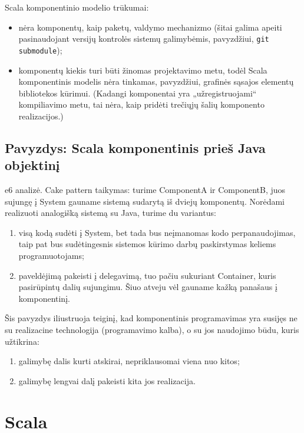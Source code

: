 Scala komponentinio modelio trūkumai:
\begin{itemize}
  \item nėra komponentų, kaip paketų, valdymo mechanizmo (šitai galima
    apeiti pasinaudojant versijų kontrolės sistemų galimybėmis,
    pavyzdžiui, \verb|git submodule|);
  \item komponentų kiekis turi būti žinomas projektavimo metu, todėl
    Scala komponentinis modelis nėra tinkamas, pavyzdžiui,
    grafinės sąsajos elementų bibliotekos 
    kūrimui. (Kadangi komponentai yra „užregistruojami“
    kompiliavimo metu, tai nėra, kaip pridėti trečiųjų šalių
    komponento realizacijos.)
\end{itemize}

\section{Pavyzdys: Scala komponentinis prieš Java objektinį}

e6 analizė. Cake pattern taikymas: turime ComponentA ir ComponentB,
juos sujungę į System gauname sistemą sudarytą iš dviejų komponentų.
Norėdami realizuoti analogišką sistemą su Java, turime du variantus:
\begin{enumerate}
  \item visą kodą sudėti į System, bet tada bus neįmanomas kodo
    perpanaudojimas, taip pat bus sudėtingesnis sistemos kūrimo
    darbų paskirstymas keliems programuotojams;
  \item \label{scala:exmp:enum:2} paveldėjimą pakeisti į delegavimą,
    tuo pačiu sukuriant Container, kuris pasirūpintų dalių
    sujungimu. Šiuo atveju vėl gauname kažką panašaus į
    komponentinį.
\end{enumerate}

Šis pavyzdys iliustruoja teiginį, kad komponentinis programavimas yra
susijęs ne su realizacine technologija (programavimo kalba), o su
jos naudojimo būdu, kuris užtikrina:
\begin{enumerate}
  \item galimybę dalis kurti atskirai, nepriklausomai viena nuo kitos;
  \item galimybę lengvai dalį pakeisti kita jos realizacija.
\end{enumerate}

\chapter{Scala}

